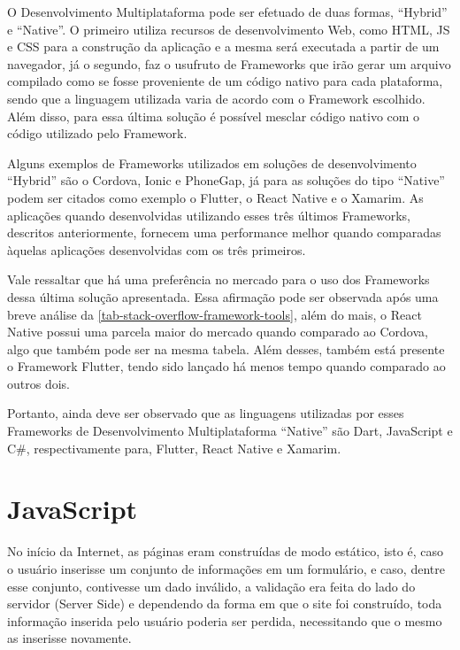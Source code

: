 O Desenvolvimento Multiplataforma pode ser efetuado de duas formas, ``Hybrid'' e ``Native''. O primeiro utiliza recursos de desenvolvimento Web, como HTML, JS e CSS para a construção da aplicação e a mesma será executada a partir de um navegador, já o segundo, faz o usufruto de Frameworks que irão gerar um arquivo compilado como se fosse proveniente de um código nativo para cada plataforma, sendo que a linguagem utilizada varia de acordo com o Framework escolhido. Além disso, para essa última solução é possível mesclar código nativo com o código utilizado pelo Framework.

Alguns exemplos de Frameworks utilizados em soluções de desenvolvimento ``Hybrid'' são o Cordova, Ionic e PhoneGap, já para as soluções do tipo ``Native'' podem ser citados como exemplo o Flutter, o React Native e o Xamarim. As aplicações quando desenvolvidas utilizando esses três últimos Frameworks, descritos anteriormente, fornecem uma performance melhor quando comparadas àquelas aplicações desenvolvidas com os três primeiros.\cite{desenvolvimentoMobile}

Vale ressaltar que há uma preferência no mercado para o uso dos Frameworks dessa última solução apresentada. Essa afirmação pode ser observada após uma breve análise da \autoref{tab-stack-overflow-framework-tools}, além do mais, o React Native possui uma parcela maior do mercado quando comparado ao Cordova, algo que também pode ser na mesma tabela. Além desses, também está presente o Framework Flutter, tendo sido lançado há menos tempo quando comparado ao outros dois.

Portanto, ainda deve ser observado que as linguagens utilizadas por esses Frameworks de Desenvolvimento Multiplataforma ``Native'' são Dart, JavaScript e C\#, respectivamente para, Flutter, React Native e Xamarim.\cite{flutterDefinition} \cite{reactNativeAbout} \cite{xamarimDefinicao}

\section{JavaScript}\label{JavaScript}

No início da Internet, as páginas eram construídas de modo estático, isto é, caso o usuário inserisse um conjunto de informações em um formulário, e caso, dentre esse conjunto, contivesse um dado inválido, a validação era feita do lado do servidor (Server Side) e dependendo da forma em que o site foi construído, toda informação inserida pelo usuário poderia ser perdida, necessitando que o mesmo as inserisse novamente.

